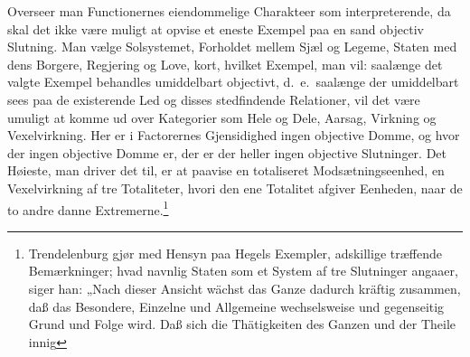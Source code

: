 \documentclass[12pt]{book}
\begin{document}
Overseer man Functionernes eiendommelige Charakteer som interpreterende, da skal det ikke være muligt at opvise et eneste Exempel paa en sand objectiv Slutning. Man vælge Solsystemet, Forholdet mellem Sjæl og Legeme, Staten med dens Borgere, Regjering og Love, kort, hvilket Exempel, man vil: saalænge det valgte Exempel behandles umiddelbart objectivt, d.\ e.\ saalænge der umiddelbart sees paa de existerende Led og disses stedfindende Relationer, vil det være umuligt at komme ud over Kategorier som Hele og Dele, Aarsag, Virkning og Vexelvirkning. Her er i Factorernes Gjensidighed ingen objective Domme, og hvor der ingen objective Domme er, der er der heller ingen objective Slutninger. Det Høieste, man driver det til, er at paavise en totaliseret Modsætningseenhed, en Vexelvirkning af tre Totaliteter, hvori den ene Totalitet afgiver Eenheden, naar de to andre danne Extremerne.\footnote{Trendelenburg gjør med Hensyn paa Hegels Exempler, adskillige træffende Bemærkninger; hvad navnlig Staten som et System af tre Slutninger angaaer, siger han: „Nach dieser Ansicht wächst das Ganze dadurch kräftig zusammen, daß das Besondere, Einzelne und Allgemeine wechselsweise und gegenseitig Grund und Folge wird. Daß sich die Thätigkeiten des Ganzen und der Theile innig %
}
\end{document}
